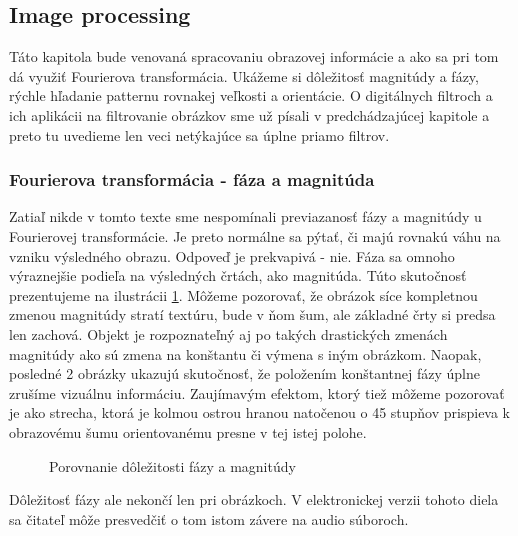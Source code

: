 \subsection{Image processing}

Táto kapitola bude venovaná spracovaniu obrazovej informácie a ako sa
pri tom dá využiť Fourierova transformácia. Ukážeme si dôležitosť
magnitúdy a fázy, rýchle hľadanie patternu rovnakej
veľkosti a orientácie. O digitálnych filtroch a ich aplikácii
na filtrovanie obrázkov sme už písali v predchádzajúcej kapitole a
preto tu uvedieme len veci netýkajúce sa úplne priamo filtrov.

\subsubsection{Fourierova transformácia - fáza a magnitúda}
Zatiaľ nikde v tomto texte sme nespomínali previazanosť fázy a
magnitúdy u Fourierovej transformácie. Je preto normálne sa pýtať, či
majú rovnakú váhu na vzniku výsledného obrazu. Odpoveď je prekvapivá -
nie. Fáza sa omnoho výraznejšie podieľa na výsledných črtách, ako
magnitúda. Túto skutočnosť prezentujeme na ilustrácii
\ref{fig:image_phase_magnitude}. Môžeme pozorovať, že obrázok síce
kompletnou zmenou magnitúdy stratí textúru, bude v ňom šum, ale
základné črty si predsa len zachová. Objekt je rozpoznateľný aj po
takých drastických zmenách magnitúdy ako sú zmena na konštantu či
výmena s iným obrázkom. Naopak, posledné 2 obrázky ukazujú skutočnosť,
že položením konštantnej fázy úplne zrušíme vizuálnu informáciu.
Zaujímavým efektom, ktorý tiež môžeme pozorovať je ako strecha, ktorá
je kolmou ostrou hranou natočenou o 45 stupňov prispieva k obrazovému
šumu orientovanému presne v tej istej polohe.
\begin{figure}[htp]
    \def\path{obrazky/informatika/image_processing/mix_phase_magnitude/}
    \caption{Porovnanie dôležitosti fázy a magnitúdy}
    \label{fig:image_phase_magnitude}
\end{figure}
Dôležitosť fázy ale nekončí len pri obrázkoch. V elektronickej verzii
tohoto diela sa čitateľ môže presvedčiť o tom istom závere na audio
súboroch.


